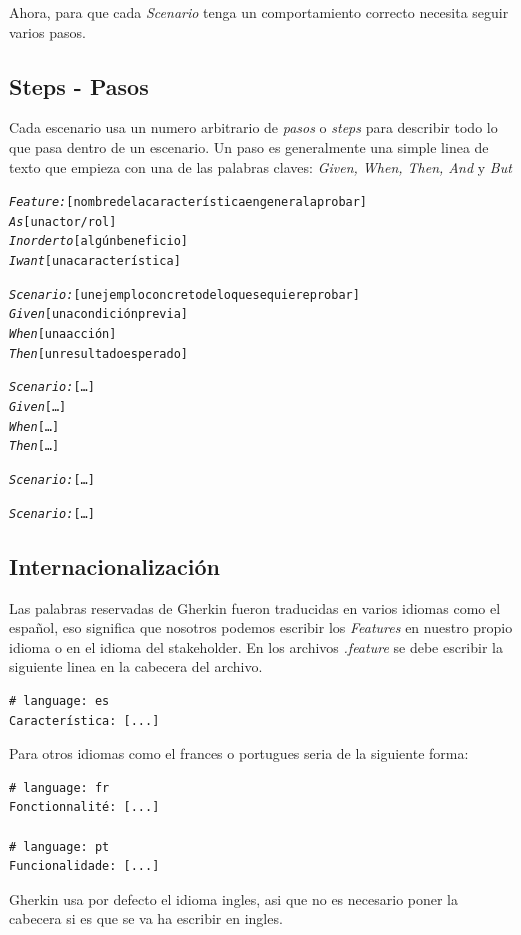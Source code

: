 Ahora, para que cada {\it Scenario} tenga un comportamiento correcto necesita
seguir varios pasos.

\subsection{Steps - Pasos}
Cada escenario usa un numero arbitrario de {\it pasos} o {\it steps} para describir
todo lo que pasa dentro de un escenario. Un paso es generalmente una simple linea
de texto que empieza con una de las palabras claves: {\it Given, When, Then, And}
y {\it But}
\newpage
\vspace{0.5cm}
\begin{mdframed}
\begin{alltt}
\emph{Feature:} [nombre de la característica en general a probar]
  \emph{As} [un actor/rol]
  \emph{In order to} [algún beneficio]
  \emph{I want} [una característica]

  \emph{Scenario:} [un ejemplo concreto de lo que se quiere probar]
    \emph{Given} [una condición previa]
    \emph{When} [una acción]
    \emph{Then} [un resultado esperado]

  \emph{Scenario:} [\ldots]
    \emph{Given} [\ldots]
    \emph{When} [\ldots]
    \emph{Then} [\ldots]

  \emph{Scenario:} [\ldots]

  \emph{Scenario:} [\ldots]
\end{alltt}
\end{mdframed}
\vspace{0.5cm}

\subsection{Internacionalización}
Las palabras reservadas de Gherkin fueron traducidas en varios idiomas como el
español, eso significa que nosotros podemos escribir los {\it Features} en nuestro
propio idioma o en el idioma del stakeholder. En los archivos {\it .feature} se
debe escribir la siguiente linea en la cabecera del archivo.
\begin{verbatim}
# language: es
Característica: [...]
\end{verbatim}

Para otros idiomas como el frances o portugues seria de la siguiente forma:

\begin{verbatim}
# language: fr
Fonctionnalité: [...]

# language: pt
Funcionalidade: [...]
\end{verbatim}
Gherkin usa por defecto el idioma ingles, asi que no es necesario poner la cabecera
si es que se va ha escribir en ingles.

